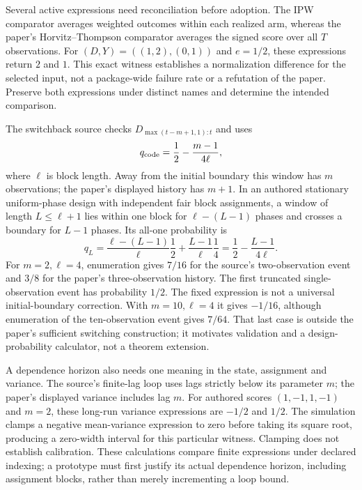 Several active expressions need reconciliation before adoption. The IPW
comparator averages weighted outcomes within each realized arm, whereas the
paper's Horvitz--Thompson comparator averages the signed score over all $T$
observations. For $(D,Y)=((1,2),(0,1))$ and $e=1/2$, these expressions return
$2$ and $1$. This exact witness establishes a normalization difference for
the selected input, not a package-wide failure rate or a refutation of the
paper. Preserve both expressions under distinct names and determine the
intended comparison.~\citep{exec25_onet_dml,exec25_onet_paper,exec25_onet_choice}

The switchback source checks $D_{\max(t-m+1,1):t}$ and uses
\[
 q_{\rm code}=\frac12-\frac{m-1}{4\ell},
\]
where $\ell$ is block length. Away from the initial boundary this window has
$m$ observations; the paper's displayed history has $m+1$. In an authored
stationary uniform-phase design with independent fair block assignments, a
window of length $L\leq\ell+1$ lies within one block for $\ell-(L-1)$ phases
and crosses a boundary for $L-1$ phases. Its all-one probability is
\[
 q_L=\frac{\ell-(L-1)}{\ell}\frac12+
       \frac{L-1}{\ell}\frac14
     =\frac12-\frac{L-1}{4\ell}.
\]
For $m=2,\ell=4$, enumeration gives $7/16$ for the source's two-observation
event and $3/8$ for the paper's three-observation history. The first truncated
single-observation event has probability $1/2$. The fixed expression is not
a universal initial-boundary correction. With $m=10,\ell=4$ it gives
$-1/16$, although enumeration of the ten-observation event gives $7/64$.
That last case is outside the paper's sufficient switching construction; it
motivates validation and a design-probability calculator, not a theorem
extension.~\citep{exec25_onet_dml,exec25_onet_paper,exec25_onet_choice}

A dependence horizon also needs one meaning in the state, assignment and
variance. The source's finite-lag loop uses lags strictly below its parameter
$m$; the paper's displayed variance includes lag $m$. For authored scores
$(1,-1,1,-1)$ and $m=2$, these long-run variance expressions are $-1/2$ and
$1/2$. The simulation clamps a negative mean-variance expression to zero
before taking its square root, producing a zero-width interval for this
particular witness. Clamping does not establish calibration. These calculations
compare finite expressions under declared indexing; a prototype must first
justify its actual dependence horizon, including assignment blocks, rather
than merely incrementing a loop bound.
\citep{exec25_onet_dml,exec25_onet_paper,exec25_onet_choice}

